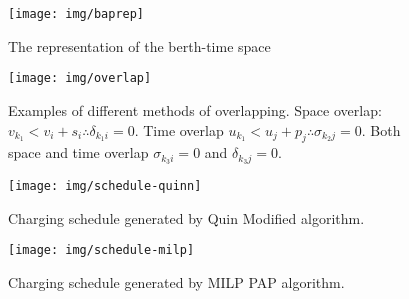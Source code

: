 \begin{figure}[ht]
\centering
    \texttt{[image: img/baprep]}
    \caption{The representation of the berth-time space}
    \label{fig:bap}
\end{figure}

\begin{figure}[htpb]
\centering
    \texttt{[image: img/overlap]}
    \caption{Examples of different methods of overlapping. Space overlap: $v_{k_1} < v_{i} + s_i \therefore \delta_{k_{1}i} = 0$.
             Time overlap $u_{k_1} < u_{j} + p_j \therefore \sigma_{k_{2}j} = 0$. Both space and time overlap $\sigma_{k_{3}i} = 0$ and
             $\delta_{k_{3}j} = 0$.}
    \label{fig:multipleassign}
\end{figure}

\begin{subfigures}
    \begin{figure}[htpb]
    \centering
        \texttt{[image: img/schedule-quinn]}
        \caption{Charging schedule generated by Quin Modified algorithm.}
        \label{subfig:quin-schedule}
    \end{figure}

    \hfill

    \begin{figure}[htpb]
    \centering
        \texttt{[image: img/schedule-milp]}
        \caption{Charging schedule generated by MILP PAP algorithm.}
        \label{subfig:milp-schedule}
    \end{figure}
\end{subfigures}

